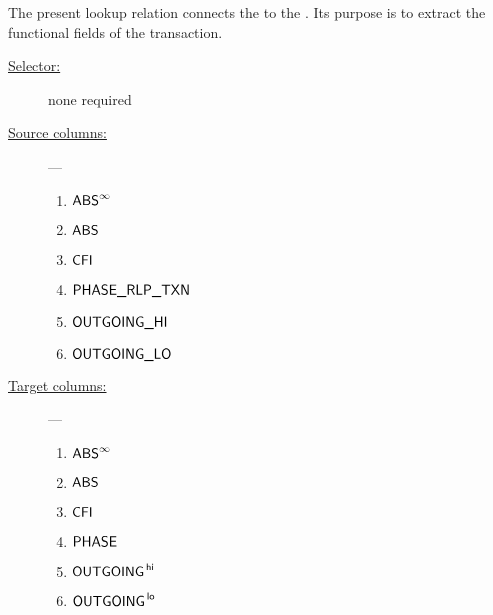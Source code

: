 The present lookup relation connects the \userTxnDataMod{} to the \rlpTxnMod{}. Its purpose is to extract the functional fields of the transaction.
\begin{description}
	\item[\underline{Selector:}] none required
	\item[\underline{Source columns:}] ---
		\begin{multicols}{3}
			\begin{enumerate}
				\item $\textsf{ABS}^\infty$
				\item $\textsf{ABS}$
				\item $\textsf{CFI}$
				\item $\textsf{PHASE\_RLP\_TXN}$
				\item $\textsf{OUTGOING}\textsf{\_HI}$
				\item $\textsf{OUTGOING}\textsf{\_LO}$
			\end{enumerate}
		\end{multicols}
	\item[\underline{Target columns:}] ---
		\begin{multicols}{3}
			\begin{enumerate}
				\item $\textsf{ABS}^\infty$
				\item $\textsf{ABS}$
				\item $\textsf{CFI}$
				\item $\textsf{PHASE}$
				\item $\textsf{OUTGOING}^{\mathsf{\,hi}}$
				\item $\textsf{OUTGOING}^{\mathsf{\,lo}}$
			\end{enumerate}
		\end{multicols}
\end{description}

